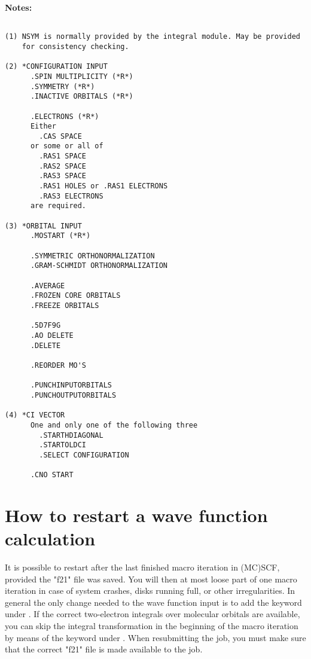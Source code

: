 {\bf Notes:}

\begin{verbatim}

(1) NSYM is normally provided by the integral module. May be provided
    for consistency checking.

(2) *CONFIGURATION INPUT
      .SPIN MULTIPLICITY (*R*)
      .SYMMETRY (*R*)
      .INACTIVE ORBITALS (*R*)

      .ELECTRONS (*R*)
      Either
        .CAS SPACE
      or some or all of
        .RAS1 SPACE
        .RAS2 SPACE
        .RAS3 SPACE
        .RAS1 HOLES or .RAS1 ELECTRONS
        .RAS3 ELECTRONS
      are required.

(3) *ORBITAL INPUT
      .MOSTART (*R*)

      .SYMMETRIC ORTHONORMALIZATION
      .GRAM-SCHMIDT ORTHONORMALIZATION

      .AVERAGE
      .FROZEN CORE ORBITALS
      .FREEZE ORBITALS

      .5D7F9G
      .AO DELETE
      .DELETE

      .REORDER MO'S

      .PUNCHINPUTORBITALS
      .PUNCHOUTPUTORBITALS

(4) *CI VECTOR
      One and only one of the following three
        .STARTHDIAGONAL
        .STARTOLDCI
        .SELECT CONFIGURATION

      .CNO START
\end{verbatim}

\pagebreak[3]
\section{\label{sec:ig_restart} How to restart a wave function calculation}

It is possible to restart after the last finished
macro iteration in (MC)SCF, provided the "f21"
 file was saved.  You will then at most
loose part of one macro iteration in case of system crashes, disks
running full, or other irregularities. \noindent In general the
only change needed to the wave function input is to add the
 keyword under . If the correct
two-electron integrals over molecular orbitals are available, you
can skip the integral transformation in the beginning of the macro iteration by means
of the  keyword under
. When resubmitting the job, you must make
sure that the correct "f21"  file is
made available to the job.


